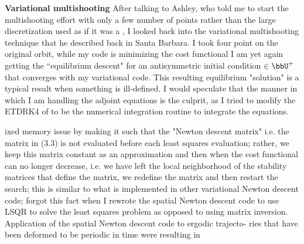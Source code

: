 {\bf Variational multishooting}
After talking to Ashley, who told me to start the multishooting
effort with only a few number of points rather than the large
discretization used as if it was a {\descent}, I looked back
into the variational multishooting technique that he described back
in Santa Barbara. I took four point on the original orbit, while
my code is minimizing the cost functional 
I am yet again getting the ``equilibrium descent" for an antisymmetric initial
condition $\in \bbU^+$ that converges with my variational {\descent} code.
This resulting equilibrium "solution" is a typical result when
something is ill-defined. I would speculate that the manner in which
I am handling the adjoint equations is the culprit, as I tried to
modify the ETDRK4 of  to be the numerical integration
routine to integrate the equations.

ixed memory issue by making it such that the
"Newton descent matrix" i.e. the matrix in (3.3) is not evaluated
before each least squares evaluation; rather, we keep this matrix
constant as an approximation and then when the cost functional
can no longer decrease, i.e. we have left the local neighborhood of
the stability matrices that define the matrix, we redefine the matrix
and then restart the search; this is similar to what is implemented
in other variational Newton descent code; forgot this fact when I
rewrote the spatial Newton descent code to use LSQR to solve the
least squares problem as opposed to using matrix inversion.
Application of the spatial Newton descent code to ergodic trajecto-
ries that have been deformed to be periodic in time were resulting in
